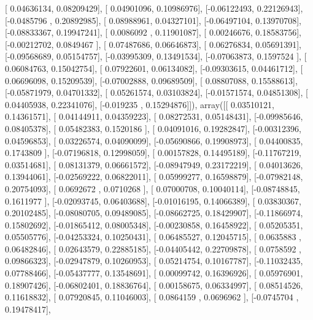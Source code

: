 \documentclass{article}
\begin{document}
       [ 0.04636134,  0.08209429],
       [ 0.04901096,  0.10986976],
       [-0.06122493,  0.22126943],
       [-0.0485796 ,  0.20892985],
       [ 0.08988961,  0.04327101],
       [-0.06497104,  0.13970708],
       [-0.08833367,  0.19947241],
       [ 0.0086092 ,  0.11901087],
       [ 0.00246676,  0.18583756],
       [-0.00212702,  0.0849467 ],
       [ 0.07487686,  0.06646873],
       [ 0.06276834,  0.05691391],
       [-0.09568689,  0.05154757],
       [-0.03995309,  0.13491534],
       [-0.07063873,  0.1597524 ],
       [ 0.06084763,  0.15042754],
       [ 0.07922601,  0.06134082],
       [-0.09303615,  0.04461712],
       [ 0.06696098,  0.15209539],
       [-0.07002888,  0.09689509],
       [ 0.08807088,  0.15588613],
       [-0.05871979,  0.04701332],
       [ 0.05261574,  0.03103824],
       [-0.01571574,  0.04851308],
       [ 0.04405938,  0.22341076],
       [-0.019235  ,  0.15294876]]), array([[ 0.03510121,  0.14361571],
       [ 0.04144911,  0.04359223],
       [ 0.08272531,  0.05148431],
       [-0.09985646,  0.08405378],
       [ 0.05482383,  0.1520186 ],
       [ 0.04091016,  0.19282847],
       [-0.00312396,  0.04596853],
       [ 0.03226574,  0.04090099],
       [-0.05690866,  0.19908973],
       [ 0.04400835,  0.1743809 ],
       [-0.07196818,  0.12998059],
       [ 0.00157828,  0.14495189],
       [-0.11767219,  0.03514681],
       [ 0.08131379,  0.06661572],
       [-0.08947949,  0.23172219],
       [ 0.04013626,  0.13944061],
       [-0.02569222,  0.06822011],
       [ 0.05999277,  0.16598879],
       [-0.07982148,  0.20754093],
       [ 0.0692672 ,  0.0710268 ],
       [ 0.07000708,  0.10040114],
       [-0.08748845,  0.1611977 ],
       [-0.02093745,  0.06403688],
       [-0.01016195,  0.14066389],
       [ 0.03830367,  0.20102485],
       [-0.08080705,  0.09489085],
       [-0.08662725,  0.18429907],
       [-0.11866974,  0.15802692],
       [-0.01865412,  0.08005348],
       [-0.00230858,  0.16458922],
       [ 0.05205351,  0.05505776],
       [-0.04253324,  0.10250431],
       [ 0.06485527,  0.12045715],
       [ 0.0635883 ,  0.06482846],
       [ 0.02643579,  0.22885185],
       [-0.04405442,  0.22709878],
       [ 0.0758592 ,  0.09866323],
       [-0.02947879,  0.10260953],
       [ 0.05214754,  0.10167787],
       [-0.11032435,  0.07788466],
       [-0.05437777,  0.13548691],
       [ 0.00099742,  0.16396926],
       [ 0.05976901,  0.18907426],
       [-0.06802401,  0.18836764],
       [ 0.00158675,  0.06334997],
       [ 0.08514526,  0.11618832],
       [ 0.07920845,  0.11046003],
       [ 0.0864159 ,  0.0696962 ],
       [-0.0745704 ,  0.19478417],
\end{document}
